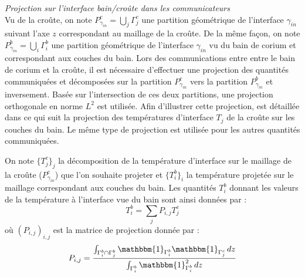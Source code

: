{\it Projection sur l'interface bain/croûte dans les communicateurs}\\
Vu de la croûte, on note $P_{\gamma_{in}}^{c}=\displaystyle{\bigcup_j} \Gamma_j^c$ une partition géométrique de l'interface $\gamma_{in}$ suivant l'axe $z$ correspondant au maillage de la croûte. De la même façon, on note $P_{\gamma_{in}}^{b}=\displaystyle{\bigcup_i} \Gamma_i^b$ une partition géométrique de l'interface $\gamma_{in}$ vu du bain de corium et correspondant aux couches du bain. Lors des communications entre entre le bain de corium et la croûte, il est nécessaire d'effectuer une projection des quantités communiquées et décomposées sur la partition $P_{\gamma_{in}}^{c}$ vers la partition $P_{\gamma_{in}}^{b}$ et inversement. Basée sur l'intersection de ces deux partitions, une projection orthogonale en norme $L^2$ est utilisée. Afin d'illustrer cette projection, est détaillée dans ce qui suit la projection des températures d'interface $T_j$ de la croûte sur les couches du bain. Le même type de projection est utilisée pour les autres quantités communiquées.

On note $\{T_j^c\}_j$ la décomposition de la température d'interface sur le maillage de la croûte ($P_{\gamma_{in}}^{c}$) que l'on souhaite projeter et $\{T_i^b\}_i$ la température projetée sur le maillage correspondant aux couches du bain.
Les quantités $T_i^b$ donnant les valeurs de la température à l'interface vue du bain sont ainsi données par : $$T_i^b=\sum_j P_{i,j} T_j^c$$ où $\left(P_{i,j}\right)_{i,j}$ est la matrice de projection donnée par : $$P_{i,j}=\frac{\int_{\Gamma_i^b\cap\Gamma_j^b}{\mathbbm{1}}_{\Gamma_i^b}{\mathbbm{1}}_{\Gamma_j^c}\, dz}{ \int_{\Gamma_i^b}{\mathbbm{1}}_{\Gamma_i^b}^2\, dz}$$


